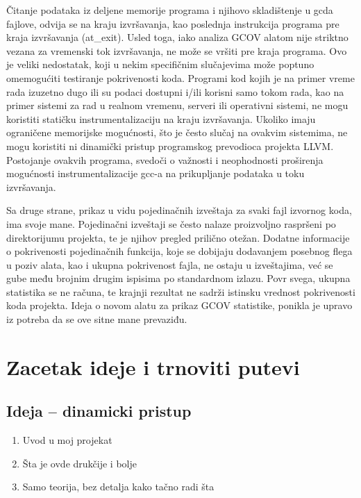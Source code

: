 \documentclass[12pt,oneside]{memoir}
\begin{document}
Čitanje podataka iz deljene memorije programa i njihovo skladištenje u gcda fajlove, odvija se na kraju izvršavanja, kao poslednja instrukcija programa pre kraja izvršavanja (at\_exit). Usled toga, iako analiza GCOV alatom nije striktno vezana za vremenski tok izvršavanja, ne može se vršiti pre kraja programa. Ovo je veliki nedostatak, koji u nekim specifičnim slučajevima može poptuno omemogućiti testiranje pokrivenosti koda. Programi kod kojih je na primer vreme rada izuzetno dugo ili su podaci dostupni i/ili korisni samo tokom rada, kao na primer sistemi za rad u realnom vremenu, serveri ili operativni sistemi, ne mogu koristiti statičku instrumentalizaciju na kraju izvršavanja. Ukoliko imaju ograničene memorijske mogućnosti, što je često slučaj na ovakvim sistemima, ne mogu koristiti ni dinamički pristup programskog prevodioca projekta LLVM. Postojanje ovakvih programa, svedoči o važnosti i neophodnosti proširenja mogućnosti instrumentalizacije gcc-a na prikupljanje podataka u toku izvršavanja. 


Sa druge strane, prikaz u vidu pojedinačnih izveštaja za svaki fajl izvornog koda, ima svoje mane. Pojedinačni izveštaji se često nalaze proizvoljno raspršeni po direktorijumu projekta, te je njihov pregled prilično otežan. Dodatne informacije o pokrivenosti pojedinačnih funkcija, koje se dobijaju dodavanjem posebnog flega u poziv alata, kao i ukupna pokrivenost fajla, ne ostaju u izveštajima, već se gube među brojnim drugim ispisima po standardnom izlazu. Povr svega, ukupna statistika se ne računa, te krajnji rezultat ne sadrži istinsku vrednost pokrivenosti koda projekta. Ideja o novom alatu za prikaz GCOV statistike, ponikla je upravo iz potreba da se ove sitne mane prevaziđu. 





\chapter{Zacetak ideje i trnoviti putevi}
\label{chp:ideja}

\section{Ideja – dinamicki pristup}

\begin{enumerate}
\item Uvod u moj projekat
\item Šta je ovde drukčije i bolje
\item Samo teorija, bez detalja kako tačno radi šta
\end{enumerate}
\end{document}
